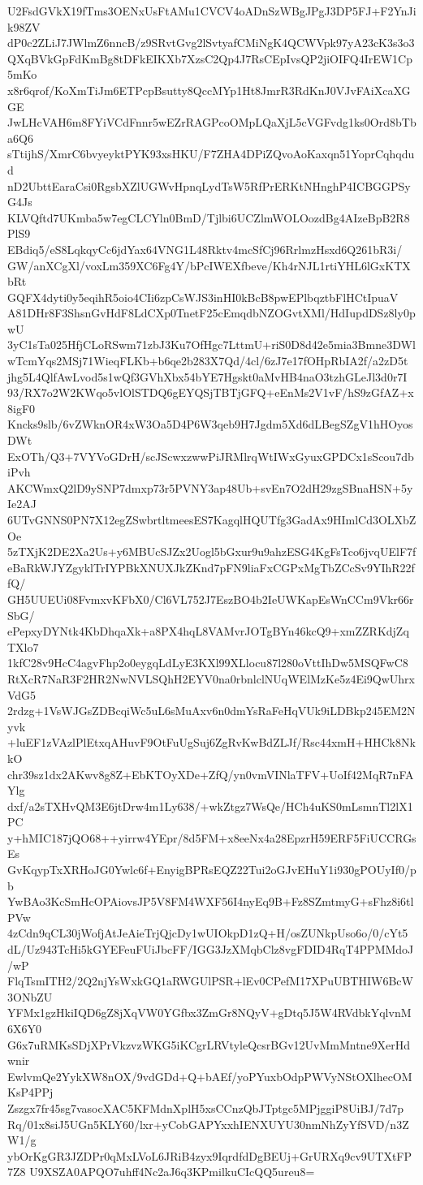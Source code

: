 U2FsdGVkX19fTms3OENxUsFtAMu1CVCV4oADnSzWBgJPgJ3DP5FJ+F2YnJik98ZV
dP0c2ZLiJ7JWlmZ6nncB/z9SRvtGvg2lSvtyafCMiNgK4QCWVpk97yA23cK3s3o3
QXqBVkGpFdKmBg8tDFkEIKXb7XzsC2Qp4J7RsCEpIvsQP2jiOIFQ4IrEW1Cp5mKo
x8r6qrof/KoXmTiJm6ETPcpBsutty8QccMYp1Ht8JmrR3RdKnJ0VJvFAiXcaXGGE
JwLHcVAH6m8FYiVCdFnnr5wEZrRAGPcoOMpLQaXjL5cVGFvdg1ks0Ord8bTba6Q6
sTtijhS/XmrC6bvyeyktPYK93xsHKU/F7ZHA4DPiZQvoAoKaxqn51YoprCqhqdud
nD2UbttEaraCsi0RgsbXZlUGWvHpnqLydTsW5RfPrERKtNHnghP4ICBGGPSyG4Js
KLVQftd7UKmba5w7egCLCYln0BmD/Tjlbi6UCZlmWOLOozdBg4AIzeBpB2R8PlS9
EBdiq5/eS8LqkqyCc6jdYax64VNG1L48Rktv4mcSfCj96RrlmzHsxd6Q261bR3i/
GW/anXCgXl/voxLm359XC6Fg4Y/bPcIWEXfbeve/Kh4rNJL1rtiYHL6lGxKTXbRt
GQFX4dyti0y5eqihR5oio4CIi6zpCsWJS3inHI0kBcB8pwEPlbqztbFlHCtIpuaV
A81DHr8F3ShsnGvHdF8LdCXp0TnetF25cEmqdbNZOGvtXMl/HdIupdDSz8ly0pwU
3yC1sTa025HfjCLoRSwm71zbJ3Ku7OfHgc7LttmU+riS0D8d42e5mia3Bmne3DWl
wTcmYqs2MSj71WieqFLKb+b6qe2b283X7Qd/4cl/6zJ7e17fOHpRbIA2f/a2zD5t
jhg5L4QlfAwLvod5s1wQf3GVhXbx54bYE7Hgskt0aMvHB4naO3tzhGLeJl3d0r7I
93/RX7o2W2KWqo5vlOlSTDQ6gEYQSjTBTjGFQ+eEnMs2V1vF/hS9zGfAZ+x8igF0
Kncks9slb/6vZWknOR4xW3Oa5D4P6W3qeb9H7Jgdm5Xd6dLBegSZgV1hHOyosDWt
ExOTh/Q3+7VYVoGDrH/scJScwxzwwPiJRMlrqWtIWxGyuxGPDCx1sScou7dbiPvh
AKCWmxQ2lD9ySNP7dmxp73r5PVNY3ap48Ub+svEn7O2dH29zgSBnaHSN+5yIe2AJ
6UTvGNNS0PN7X12egZSwbrtltmeesES7KagqlHQUTfg3GadAx9HImlCd3OLXbZOe
5zTXjK2DE2Xa2Us+y6MBUcSJZx2Uogl5bGxur9u9ahzESG4KgFsTco6jvqUElF7f
eBaRkWJYZgyklTrIYPBkXNUXJkZKnd7pFN9liaFxCGPxMgTbZCcSv9YIhR22ffQ/
GH5UUEUi08FvmxvKFbX0/Cl6VL752J7EszBO4b2IeUWKapEsWnCCm9Vkr66rSbG/
ePepxyDYNtk4KbDhqaXk+a8PX4hqL8VAMvrJOTgBYn46kcQ9+xmZZRKdjZqTXlo7
1kfC28v9HcC4agvFhp2o0eygqLdLyE3KXl99XLlocu87l280oVttIhDw5MSQFwC8
RtXcR7NaR3F2HR2NwNVLSQhH2EYV0na0rbnlclNUqWElMzKe5z4Ei9QwUhrxVdG5
2rdzg+1VsWJGsZDBcqiWc5uL6sMuAxv6n0dmYsRaFeHqVUk9iLDBkp245EM2Nyvk
+luEF1zVAzlPlEtxqAHuvF9OtFuUgSuj6ZgRvKwBdZLJf/Rsc44xmH+HHCk8NkkO
chr39sz1dx2AKwv8g8Z+EbKTOyXDe+ZfQ/yn0vmVINlaTFV+UoIf42MqR7nFAYlg
dxf/a2sTXHvQM3E6jtDrw4m1Ly638/+wkZtgz7WsQe/HCh4uKS0mLsmnTl2lX1PC
y+hMIC187jQO68++yirrw4YEpr/8d5FM+x8eeNx4a28EpzrH59ERF5FiUCCRGsEs
GvKqypTxXRHoJG0Ywlc6f+EnyigBPRsEQZ22Tui2oGJvEHuY1i930gPOUyIf0/pb
YwBAo3KcSmHcOPAiovsJP5V8FM4WXF56I4nyEq9B+Fz8SZmtmyG+sFhz8i6tlPVw
4zCdn9qCL30jWofjAtJeAieTrjQjcDy1wUIOkpD1zQ+H/osZUNkpUso6o/0/cYt5
dL/Uz943TcHi5kGYEFeuFUiJbcFF/IGG3JzXMqbClz8vgFDID4RqT4PPMMdoJ/wP
FlqTsmITH2/2Q2njYsWxkGQ1aRWGUlPSR+lEv0CPefM17XPuUBTHIW6BcW3ONbZU
YFMx1gzHkiIQD6gZ8jXqVW0YGfbx3ZmGr8NQyV+gDtq5J5W4RVdbkYqlvnM6X6Y0
G6x7uRMKsSDjXPrVkzvzWKG5iKCgrLRVtyleQcsrBGv12UvMmMntne9XerHdwnir
EwlvmQe2YykXW8nOX/9vdGDd+Q+bAEf/yoPYuxbOdpPWVyNStOXlhecOMKsP4PPj
Zszgx7fr45sg7vasocXAC5KFMdnXplH5xsCCnzQbJTptgc5MPjggiP8UiBJ/7d7p
Rq/01x8siJ5UGn5KLY60/lxr+yCobGAPYxxhIENXUYU30nmNhZyYfSVD/n3ZW1/g
ybOrKgGR3JZDPr0qMxLVoL6JRiB4zyx9IqrdfdDgBEUj+GrURXq9cv9UTXtFP7Z8
U9XSZA0APQO7uhff4Nc2aJ6q3KPmilkuCIcQQ5ureu8=
